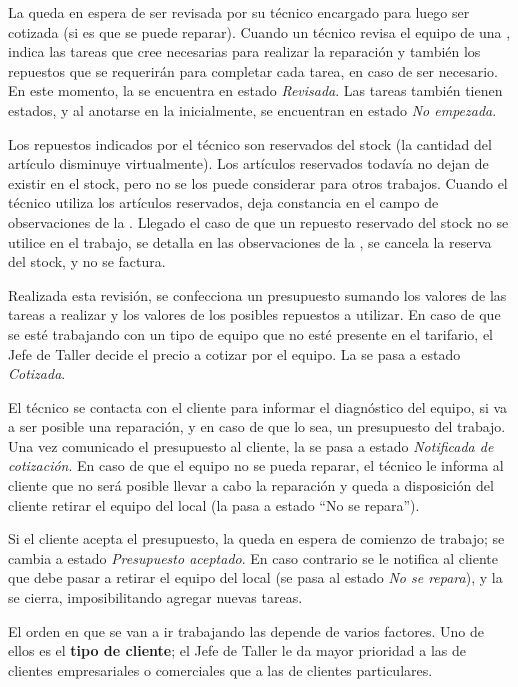 \documentclass[12pt]{extarticle}
\begin{document}
\begin{spacing}{1.2}
    La \OT{} queda en espera de ser revisada por su técnico encargado para luego ser cotizada (si es que se puede reparar).
    Cuando un técnico revisa el equipo de una \OT{}, indica las tareas que cree necesarias para realizar la reparación y también los repuestos que se requerirán para completar cada tarea, en caso de ser necesario. En este momento, la \OT{} se encuentra en estado \textit{Revisada}. Las tareas también tienen estados, y al anotarse en la \OT{} inicialmente, se encuentran en estado \textit{No empezada}.
    
    Los repuestos indicados por el técnico son reservados del stock (la cantidad del artículo disminuye virtualmente). Los artículos reservados todavía no dejan de existir en el stock, pero no se los puede considerar para otros trabajos. Cuando el técnico utiliza los artículos reservados, deja constancia en el campo de observaciones de la \OT{}.  Llegado el caso de que un repuesto reservado del stock no se utilice en el trabajo, se detalla en las observaciones de la \OT{}, se cancela la reserva del stock, y no se factura.

    Realizada esta revisión, se confecciona un presupuesto sumando los valores de las tareas a realizar y los valores de los posibles repuestos a utilizar. En caso de que se esté trabajando con un tipo de equipo que no esté presente en el tarifario, el Jefe de Taller decide el precio a cotizar por el equipo. La \OT{} se pasa a estado \textit{Cotizada}.
    
    El técnico se contacta con el cliente para informar el diagnóstico del equipo, si va a ser posible una reparación, y en caso de que lo sea, un presupuesto del trabajo. Una vez comunicado el presupuesto al cliente, la \OT{} se pasa a estado \textit{Notificada de cotización}. En caso de que el equipo no se pueda reparar, el técnico le informa al cliente que no será posible llevar a cabo la reparación y queda a disposición del cliente retirar el equipo del local (la \OT{} pasa a estado ``No se repara'').
  
    Si el cliente acepta el presupuesto, la \OT{} queda en espera de comienzo de trabajo; se cambia a estado \textit{Presupuesto aceptado}. En caso contrario se le notifica al cliente que debe pasar a retirar el equipo del local (se pasa al estado \textit{No se repara}), y la \OT{} se cierra, imposibilitando agregar nuevas tareas.

    El orden en que se van a ir trabajando las \OTs{} depende de varios factores. Uno de ellos es el \textbf{tipo de cliente}; el Jefe de Taller le da mayor prioridad a las \OTs{} de clientes empresariales o comerciales que a las de clientes particulares.


\end{spacing}
\end{document}
